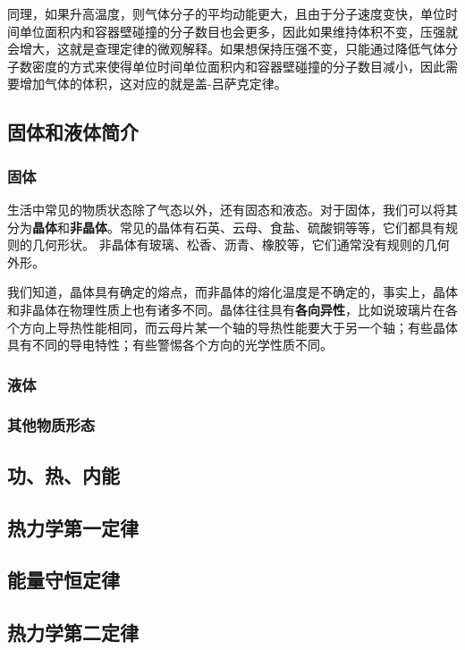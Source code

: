  同理，如果升高温度，则气体分子的平均动能更大，且由于分子速度变快，单位时间单位面积内和容器壁碰撞的分子数目也会更多，因此如果维持体积不变，压强就会增大，这就是查理定律的微观解释。如果想保持压强不变，只能通过降低气体分子数密度的方式来使得单位时间单位面积内和容器壁碰撞的分子数目减小，因此需要增加气体的体积，这对应的就是盖-吕萨克定律。
\subsection{固体和液体简介}
\subsubsection{固体}
生活中常见的物质状态除了气态以外，还有固态和液态。对于固体，我们可以将其分为\textbf{晶体}和\textbf{非晶体}。常见的晶体有石英、云母、食盐、硫酸铜等等，它们都具有规则的几何形状。
非晶体有玻璃、松香、沥青、橡胶等，它们通常没有规则的几何外形。

我们知道，晶体具有确定的熔点，而非晶体的熔化温度是不确定的，事实上，晶体和非晶体在物理性质上也有诸多不同。晶体往往具有\textbf{各向异性}，比如说玻璃片在各个方向上导热性能相同，而云母片某一个轴的导热性能要大于另一个轴；有些晶体具有不同的导电特性；有些警惕各个方向的光学性质不同。


\subsubsection{液体}


\subsubsection{其他物质形态}

\subsection{功、热、内能}
\subsection{热力学第一定律}
\subsection{能量守恒定律}
\subsection{热力学第二定律}




